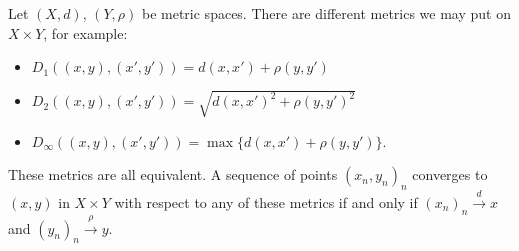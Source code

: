     \begin{example}
        Let $(X,d)$, $(Y,\rho)$ be metric spaces. There are different metrics we may put on $X \times Y$, for example:
            \begin{itemize}
                \item $D_1((x,y),(x',y')) = d(x,x') + \rho(y,y')$ 
                \item $D_2((x,y),(x',y')) = \sqrt{d(x,x')^2 + \rho(y,y')^2}$
                \item $D_\infty((x,y),(x',y')) = \max\{d(x,x') + \rho(y,y')\}$.
            \end{itemize}
        These metrics are all equivalent. A sequence of points $(x_n,y_n)_n$ converges to $(x,y)$ in $X \times Y$ with respect to any of these metrics if and only if $(x_n)_n \xrightarrow{d} x$ and $(y_n)_n \xrightarrow{\rho} y$.
    \end{example}
    \fi

    \iffalse
    \begin{example}
        Let $\{(X_k,d_k)_k\}_k$ be a family of metric spaces where the $d_k$ are uniformly bounded. We looked at the product:
            \begin{equation*}
            \begin{split}
                X = \prod_{k = 1}^\infty X_k
            \end{split}
            \end{equation*}
        with:
            \begin{equation*}
            \begin{split}
                d(f,g) = \sum_{k = 1}^\infty 2^{-k}d_k(f(k),g(k)).
            \end{split}
            \end{equation*}
        We have that $(f_n)_n \xrightarrow{d} f$ if and only if $(f_n(k))_n \rightarrow f(k)$ for all $k$ (pointwise convergence).
    \end{example}

    \begin{example}
        Let $(V,\lnorm \cdot \rnorm)$ be a normed space. Then $(v_n)_n \rightarrow v$ if and only if $(\lnorm v_n - v \rnorm)_n \rightarrow 0$.
    \end{example}
    \fi

    \begin{center}
    \end{center}


